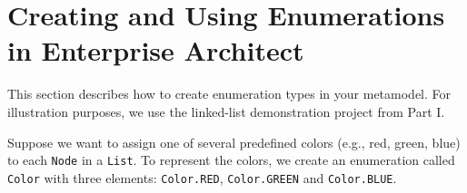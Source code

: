 \clearpage
\section{Creating and Using Enumerations in Enterprise Architect}
\genHeader

This section describes how to create enumeration types in your metamodel.
For illustration purposes, we use the linked-list demonstration project from
Part I.

Suppose we want to assign one of several predefined colors (e.g., red, green,
blue) to each \texttt{Node} in a \texttt{List}.
To represent the colors, we create an enumeration called \texttt{Color} with
three elements: \texttt{Color.RED}, \texttt{Color.GREEN} and
\texttt{Color.BLUE}.

